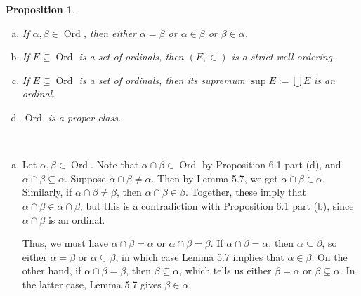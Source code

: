 \documentclass[10pt]{article}
\makeatletter
\DeclareMathOperator{\Ord}{Ord}
\theoremstyle{newstyle}
\newtheorem{prop}[thm]{Proposition}
\newenvironment{pf}[1][\proofname]{\par
  \pushQED{\qed}%
  \normalfont \topsep0\p@\relax
  \trivlist
  \item[\hskip\labelsep\scshape
  #1\@addpunct{.}]\ignorespaces
}{%
  \popQED\endtrivlist\@endpefalse
}
\makeatother
\begin{document}
\begin{prop}~ 
\begin{enumerate}[(a)]
    \item If $\alpha, \beta \in \Ord$, then either $\alpha = \beta$ or $\alpha \in \beta$ or 
    $\beta \in \alpha$. 
    \item If $E \subseteq \Ord$ is a set of ordinals, then $(E, \in)$ is a strict well-ordering. 
    \item If $E \subseteq \Ord$ is a set of ordinals, then its supremum $\sup E := \bigcup E$ 
    is an ordinal. 
    \item $\Ord$ is a proper class.
\end{enumerate} 
\end{prop}
\begin{pf}~ 
\begin{enumerate}[(a)]
    \item Let $\alpha, \beta \in \Ord$. Note that $\alpha \cap \beta \in \Ord$ by Proposition 6.1 part (d), and $\alpha \cap \beta \subseteq \alpha$. Suppose $\alpha \cap \beta \neq \alpha$. Then 
    by Lemma 5.7, we get $\alpha \cap \beta \in \alpha$. Similarly, if $\alpha \cap \beta \neq 
    \beta$, then $\alpha \cap \beta \in \beta$. Together, these imply that 
    $\alpha \cap \beta \in \alpha \cap \beta$, but this is a contradiction with Proposition 6.1 part (b), 
    since $\alpha \cap \beta$ is an ordinal.
    
    Thus, we must have $\alpha \cap \beta = \alpha$ or $\alpha \cap \beta = \beta$. 
    If $\alpha \cap \beta = \alpha$, then $\alpha \subseteq \beta$, so either $\alpha = \beta$ or $\alpha \subsetneq \beta$, in which case Lemma 5.7 implies that $\alpha \in \beta$. On the other hand, if 
    $\alpha \cap \beta = \beta$, then $\beta \subseteq \alpha$, which tells us either 
    $\beta = \alpha$ or $\beta \subsetneq \alpha$. In the latter case, Lemma 5.7 gives $\beta \in \alpha$.
    

\end{enumerate}
\end{pf}
\end{document}
